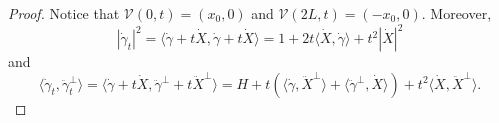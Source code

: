 \documentclass[11pt]{amsart}
\theoremstyle{definition}
\theoremstyle{remark}
\numberwithin{equation}{section}
\begin{document}
	\begin{proof}
		Notice that $\mathcal V(0,t)=(x_0,0)$ and $\mathcal V(2L,t)=(-x_0,0)$. Moreover,
		\begin{equation}\label{gammadotcomp}
			|\dot\gamma_t|^2=\langle\dot \gamma+t\dot X,\dot \gamma+t\dot X\rangle=1+2t\langle\dot X,\dot \gamma\rangle+t^2|\dot X|^2
		\end{equation}
		and
		\begin{equation}\label{bohnonmiricordo}
			\langle \dot\gamma_t,\ddot\gamma_t^\perp\rangle=\langle\dot \gamma+t\dot X,\ddot \gamma^\perp+t\ddot X^\perp\rangle=H+t\left(\langle\dot\gamma,\ddot X^\perp\rangle+\langle\ddot\gamma^\perp,\dot X\rangle\right)+t^2\langle\dot X,\ddot X^\perp\rangle.
		\end{equation}

\end{proof}
\end{document}
